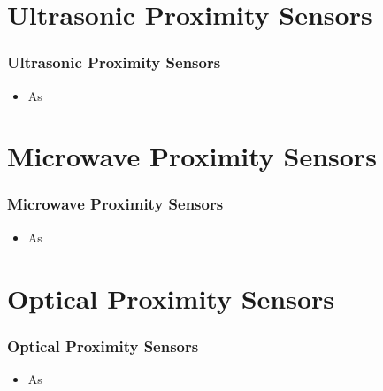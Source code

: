 \documentclass[xcolor=dvipsnames, aspectratio=169]{beamer}
\begin{document}
\section[Ultrasonic Proximity Sensors]{Ultrasonic Proximity Sensors} 
\begin{frame}
\frametitle{Ultrasonic Proximity Sensors}
	\begin{itemize}
		\item As
	\end{itemize}
\end{frame}

\section[Microwave Proximity Sensors]{Microwave Proximity Sensors} 
\begin{frame}
\frametitle{Microwave Proximity Sensors}
	\begin{itemize}
		\item As
	\end{itemize}
\end{frame}

\section[Optical Proximity Sensors]{Optical Proximity Sensors} 
\begin{frame}
\frametitle{Optical Proximity Sensors}
	\begin{itemize}
		\item As
	\end{itemize}
\end{frame}



\begin{frame}
    \printbibliography
\end{frame}


\begin{frame}
\titlepage %
\end{frame}
\end{document}
